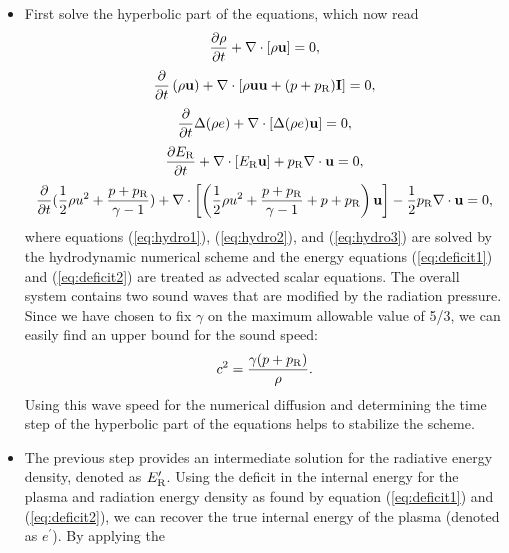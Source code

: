 \documentclass[12pt]{article}
\newcommand{\Erad}{E_{\rm R}}
\newcommand{\prad}{p_{\rm R}}
\begin{document}
\begin{itemize} 
\item First solve the hyperbolic part of the equations, which now read 
\begin{equation}\label{eq:hydro1} \frac{\partial\rho}{\partial t} +
\nabla\cdot\left[ \rho {\bf u} \right] = 0, \end{equation} 
\begin{equation}\label{eq:hydro2}   \frac{\partial}{\partial t}\left( 
\rho {\bf u} \right) + \nabla\cdot\left[ \rho{\bf u}{\bf u}     
+(p+\prad){\bf I} \right] = 0, 
\end{equation} 
\begin{equation}\label{eq:deficit1}   
\frac{\partial}{\partial t} \Delta(\rho e) + \nabla\cdot\left[  
\Delta(\rho e) {\bf u} \right] = 0, 
\end{equation} 
\begin{equation}\label{eq:deficit2}   
\frac{\partial \Erad}{\partial t} + \nabla\cdot \left[ \Erad {\bf u} 
\right]   + \prad\nabla\cdot{\bf u} = 0, 
\end{equation} 
\begin{equation}\label{eq:hydro3}   \frac{\partial}{\partial t} 
(\frac{1}{2}\rho u^2 + \frac{p+\prad}{\gamma - 1}) + \nabla\cdot   
\left[ \left( \frac{1}{2}\rho u^2 + \frac{p+\prad}{\gamma - 1} + 
p+\prad \right) {\bf u} \right]   - 
\frac{1}{2}\prad\nabla\cdot{\bf u} = 0, 
\end{equation} 
where equations (\ref{eq:hydro1}), (\ref{eq:hydro2}), and (\ref{eq:hydro3}) 
are solved by the hydrodynamic numerical scheme and the energy equations 
(\ref{eq:deficit1}) and (\ref{eq:deficit2}) are treated as advected scalar 
equations. The overall system contains two sound waves that are modified by 
the radiation pressure. Since we have chosen to fix $\gamma$ on the maximum 
allowable value of 5/3, we can easily find an upper bound for the sound speed: 
\begin{equation}  
c^2=\frac{\gamma (p+\prad)}{\rho}. 
\end{equation} 
Using this wave speed for the numerical diffusion and determining the time 
step of the hyperbolic part of the equations helps to stabilize the scheme.  
\item The previous step provides an intermediate solution for the radiative 
energy density, denoted as $\Erad^\prime$. Using the deficit in the 
internal energy for the plasma and radiation energy density as found by 
equation (\ref{eq:deficit1}) and (\ref{eq:deficit2}), we can recover the 
true internal energy of the plasma (denoted as $e^\prime$). By applying the 

\end{itemize}
\end{document}
